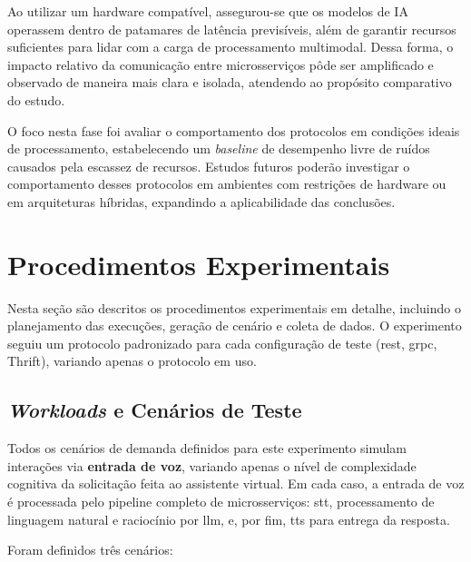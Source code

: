Ao utilizar um hardware compatível, assegurou-se que os modelos de IA operassem dentro de patamares de latência previsíveis, além de garantir recursos suficientes para lidar com a carga de processamento multimodal. Dessa forma, o impacto relativo da comunicação entre microsserviços pôde ser amplificado e observado de maneira mais clara e isolada, atendendo ao propósito comparativo do estudo.

O foco nesta fase foi avaliar o comportamento dos protocolos em condições ideais de processamento, estabelecendo um \textit{baseline} de desempenho livre de ruídos causados pela escassez de recursos. Estudos futuros poderão investigar o comportamento desses protocolos em ambientes com restrições de hardware ou em arquiteturas híbridas, expandindo a aplicabilidade das conclusões.

\section{Procedimentos Experimentais}
\label{sec:4-procedimentos_experimentais}

Nesta seção são descritos os procedimentos experimentais em detalhe, incluindo o planejamento das execuções, geração de cenário e coleta de dados. O experimento seguiu um protocolo padronizado para cada configuração de teste (\gls{rest}, \gls{grpc}, Thrift), variando apenas o protocolo em uso.

\subsection{\textit{Workloads} e Cenários de Teste}

Todos os cenários de demanda definidos para este experimento simulam interações via \textbf{entrada de voz}, variando apenas o nível de complexidade cognitiva da solicitação feita ao assistente virtual. Em cada caso, a entrada de voz é processada pelo pipeline completo de microsserviços: \acrfull{stt}, processamento de linguagem natural e raciocínio por \acrfull{llm}, e, por fim,  \acrfull{tts} para entrega da resposta.

Foram definidos três cenários:


